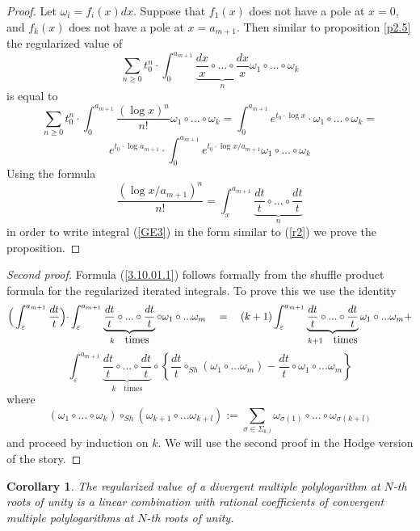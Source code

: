 \documentclass[10pt]{article}
\newtheorem{corollary}[theorem]{Corollary}
\begin{document}
\begin{proof} Let $\omega_i = f_i(x)dx$. Suppose that $f_{1}(x)$ 
does not have a pole at $x=0$, and $f_{k}(x)$ 
does not have a pole at $x=a_{m+1}$. Then similar to proposition \ref{p2.5} the regularized value of 
$$
\sum_{n\geq 0} t_0^n \cdot \int_0^{a_{m+1}} 
\underbrace{ \frac{dx}{x}\circ ... \circ \frac{dx}{x}}_{n} \omega_1 \circ ... \circ \omega_k
$$
is equal to
$$
\sum_{n\geq 0} t_0^n \cdot \int_0^{a_{m+1}} \frac{(\log x)^n}{n!}\omega_1 \circ ... \circ \omega_k = 
\int_0^{a_{m+1}} e^{t_0 \cdot \log x  } \cdot \omega_1 \circ ... \circ \omega_k = 
$$
\begin{equation}\label{GE3}
e^{t_0 \cdot \log a_{m+1}  } \cdot \int_0^{a_{m+1}} e^{t_0 \cdot \log x/a_{m+1}  } 
\omega_1 \circ ... \circ \omega_k 
\end{equation}
Using the formula
$$
\frac{(\log x/a_{m+1})^n}{n!} = \int_x^{a_{m+1}} \underbrace{ \frac{dt}{t}\circ ... \circ \frac{dt}{t}}_{n} 
$$
in order to write integral (\ref{GE3}) in the form similar to (\ref{r2}) we prove the proposition. 


\end{proof}

\begin{proof}[Second proof] Formula (\ref{3.10.01.1}) 
follows formally from the shuffle product formula for the regularized iterated 
integrals. To prove this we use the identity
$$
\Bigr(\int_{\varepsilon}^{a_{m+1}}\frac{dt}{t}\Bigl) \cdot 
\int_{\varepsilon}^{a_{m+1}} \underbrace { \frac{dt}{t} \circ ... \circ 
\frac{dt}{t}}_{k \quad  \mbox {times}} \circ 
\omega_1 \circ ... \omega_m \quad = \quad (k+1) \int_{\varepsilon}^{a_{m+1}} 
\underbrace { \frac{dt}{t} \circ ... \circ 
\frac{dt}{t}}_{k+1 \quad  \mbox {times}} \omega_1 \circ ... \omega_m +
$$
$$
\int_{\varepsilon}^{a_{m+1}} 
\underbrace { \frac{dt}{t} \circ ... \circ 
\frac{dt}{t}}_{k \quad  \mbox {times}} \circ 
\left\{ \frac{dt}{t} \circ_{Sh} (\omega_1 \circ ... \omega_m) - 
\frac{dt}{t} \circ \omega_1 \circ ... \omega_m \right\} 
$$
where 
$$
(\omega_1 \circ ... \circ\omega_ k) \circ_{Sh}(\omega_{k+1} \circ ... \omega_{k+l})
:= \sum_{\sigma \in \Sigma_{k,l}} \omega_{\sigma(1)} \circ ... \circ \omega_{\sigma(k+l)}
$$
and proceed by induction on $k$. We will use the second proof 
in the Hodge version of the story. 


\end{proof}

\begin{corollary} \label{incor}
The regularized value of a divergent multiple polylogarithm at $N$-th roots of unity is a linear combination with rational coefficients of convergent multiple polylogarithms at $N$-th roots of unity.
\end{corollary}
\end{document}
